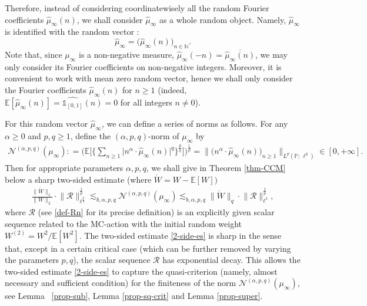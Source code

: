 \documentclass[12pt]{amsart}
\theoremstyle{definition}
\theoremstyle{remark}
\newcommand{\N}{\mathbb{N}}
\newcommand{\E}{\mathbb{E}}
\newcommand{\PP}{\mathbb{P}}
\newcommand{\NQ}{\mathcal{N}^{(\alpha, p, q)}}
\numberwithin{equation}{section}
\begin{document}
Therefore, instead of considering coordinatewisely all the random  Fourier coefficients $\widehat{\mu}_\infty(n)$, we shall consider $\widehat{\mu}_\infty$ as a whole random object. Namely, $\widehat{\mu}_\infty$  is identified with the random  vector : 
\[
\widehat{\mu}_\infty  = \big(\widehat{\mu}_\infty (n) \big)_{ n\in \N}. 
\]
Note that,  since $\mu_\infty$ is a non-negative measure, $\widehat{\mu}_\infty(-n) = \overline{\widehat{\mu}_\infty(n)}$,  we may only consider its Fourier coefficients on non-negative integers. Moreover, it is convenient to work with mean zero random vector, hence we shall only consider the Fourier coefficients $\widehat{\mu}_\infty(n)$ for $n\ge 1$ (indeed,  $\E[\widehat{\mu}_\infty(n)] =  \widehat{\mathds{1}_{[0,1]}}(n) = 0$ for all integers $n\ne 0$).  

For this random vector $\widehat{\mu}_\infty$, we can define a series of norms as follows. For any $\alpha \ge  0$ and $p, q\ge 1$, define the $(\alpha,p,q)$-norm of $\mu_\infty$ by
\begin{align}\label{eq-npq}
\mathcal{N}^{(\alpha, p, q)}(\mu_\infty): =   \Big(\E\Big[  \Big\{ \sum_{n \ge 1}    \big| n^{\alpha} \cdot \widehat{\mu}_\infty(n)\big|^q  \Big\}^{\frac{p}{q}}\Big] \Big)^{\frac{1}{p}}   = \Big\|  \big( n^{\alpha} \cdot \widehat{\mu}_\infty(n) \big)_{n \ge 1}  \Big\|_{L^p(\PP; \, \ell^q)}\in [0, +\infty].
\end{align}
Then for appropriate parameters $\alpha, p, q$,  we shall give in Theorem \ref{thm-CCM} below a sharp two-sided estimate (where $\mathring{W} = W- \E[W])$
\begin{align}\label{2-side-es}
 \frac{\|\mathring{W}\|_1}{\|W\|_2}  \cdot  \big\|\mathcal{R}\big\|_{\ell^{\frac{p}{q}}}^{\frac{1}{p}}
 \lesssim_{b, \alpha, p, q}   \NQ(\mu_\infty) 
\lesssim_{b, \alpha, p, q}  \|\mathring{W}\|_q     \cdot \big\|\mathcal{R}\big\|_{\ell^1}^{\frac{1}{p}},
\end{align}
where $\mathcal{R}$ (see  \eqref{def-Rn} for its precise definition) is an explicitly given  scalar sequence  related to the MC-action  with the initial random weight $W^{(2)} = W^2/\E[W^2]$.  The two-sided estimate \eqref{2-side-es} is sharp in the sense that, except in a certain critical case (which can be further removed by varying the parameters $p, q$), the scalar sequence   $\mathcal{R}$ has exponential decay. This  allows the two-sided estimate \eqref{2-side-es} to capture the  quasi-criterion (namely, almost necessary and sufficient condition) for the finiteness of the norm $\mathcal{N}^{(\alpha, p, q)}(\mu_\infty)$, see Lemma ~\ref{prop-sub},  Lemma \ref{prop-sq-crit} and Lemma \ref{prop-super}. 
\end{document}
